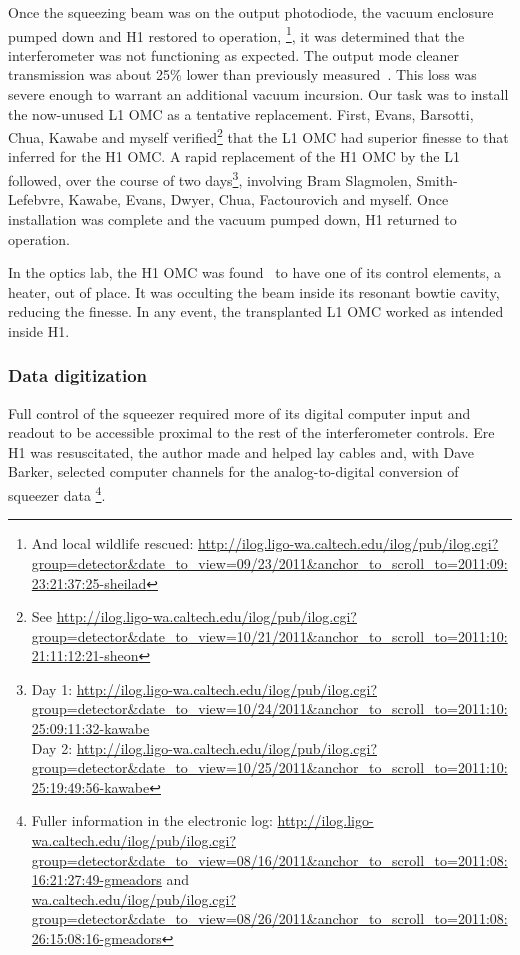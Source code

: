 Once the squeezing beam was on the output photodiode, the vacuum enclosure pumped down and H1 restored to operation,
\footnote{And local wildlife rescued: \url{http://ilog.ligo-wa.caltech.edu/ilog/pub/ilog.cgi?group=detector&date_to_view=09/23/2011&anchor_to_scroll_to=2011:09:23:21:37:25-sheilad}}, 
it was determined that the interferometer was not functioning as expected.
The output mode cleaner transmission was about 25\% lower than previously measured~\cite{Waldman2011,SmithThesis}.
This loss was severe enough to warrant an additional vacuum incursion.
Our task was to install the now-unused L1 OMC as a tentative replacement. 
First, Evans, Barsotti, Chua, Kawabe and myself verified\footnote{See \url{http://ilog.ligo-wa.caltech.edu/ilog/pub/ilog.cgi?group=detector&date_to_view=10/21/2011&anchor_to_scroll_to=2011:10:21:11:12:21-sheon}} that the L1 OMC had superior finesse to that inferred for the H1 OMC.
A rapid replacement of the H1 OMC by the L1 followed, over the course of two days\footnote{Day 1: \url{http://ilog.ligo-wa.caltech.edu/ilog/pub/ilog.cgi?group=detector&date_to_view=10/24/2011&anchor_to_scroll_to=2011:10:25:09:11:32-kawabe} \\ Day 2: \url{http://ilog.ligo-wa.caltech.edu/ilog/pub/ilog.cgi?group=detector&date_to_view=10/25/2011&anchor_to_scroll_to=2011:10:25:19:49:56-kawabe}},
involving Bram Slagmolen, Smith-Lefebvre, Kawabe, Evans, Dwyer, Chua, Factourovich and myself.
Once installation was complete and the vacuum pumped down, H1 returned to operation.

In the optics lab, the H1 OMC was found~\cite{Waldman2011} to have one of its control elements, a heater, out of place. 
It was occulting the beam inside its resonant bowtie cavity, reducing the finesse.
In any event, the transplanted L1 OMC worked as intended inside H1.


            \subsubsection{Data digitization}
            \label{data_digitization}

Full control of the squeezer required more of its digital computer input and readout to be accessible proximal to the rest of the interferometer controls.
Ere H1 was resuscitated, the author made and helped lay cables and, with Dave Barker, selected computer channels for the analog-to-digital conversion of squeezer data \footnote{Fuller information in the electronic log: \url{http://ilog.ligo-wa.caltech.edu/ilog/pub/ilog.cgi?group=detector&date_to_view=08/16/2011&anchor_to_scroll_to=2011:08:16:21:27:49-gmeadors} and \\ \url{wa.caltech.edu/ilog/pub/ilog.cgi?group=detector&date_to_view=08/26/2011&anchor_to_scroll_to=2011:08:26:15:08:16-gmeadors}}.

